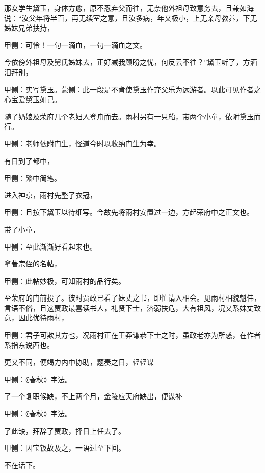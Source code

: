 \begin{parag}
    那女学生黛玉，身体方愈，原不忍弃父而往，无奈他外祖母致意务去，且兼如海说：“汝父年将半百，再无续室之意，且汝多病，年又极小，上无亲母教养，下无姊妹兄弟扶持，\begin{note}甲侧：可怜！一句一滴血，一句一滴血之文。\end{note}今依傍外祖母及舅氏姊妹去，正好减我顾盼之忧，何反云不往？”黛玉听了，方洒泪拜别，\begin{note}甲侧：实写黛玉。蒙侧：此一段是不肯使黛玉作弃父乐为远游者。以此可见作者之心宝爱黛玉如己。\end{note}随了奶娘及荣府几个老妇人登舟而去。雨村另有一只船，带两个小童，依附黛玉而行。\begin{note}甲侧：老师依附门生，怪道今时以收纳门生为幸。\end{note}
\end{parag}


\begin{parag}
    有日到了都中，\begin{note}甲侧：繁中简笔。\end{note}进入神京，雨村先整了衣冠，\begin{note}甲侧：且按下黛玉以待细写。今故先将雨村安置过一边，方起荣府中之正文也。\end{note}带了小童，\begin{note}甲侧：至此渐渐好看起来也。\end{note}拿著宗侄的名帖，\begin{note}甲侧：此帖妙极，可知雨村的品行矣。\end{note}至荣府的门前投了。彼时贾政已看了妹丈之书，即忙请入相会。见雨村相貌魁伟，言语不俗，且这贾政最喜读书人，礼贤下士，济弱扶危，大有祖风，况又系妹丈致意，因此优待雨村，\begin{note}甲侧：君子可欺其方也，况雨村正在王莽谦恭下士之时，虽政老亦为所惑，在作者系指东说西也。\end{note}更又不同，便竭力内中协助，题奏之日，轻轻谋\begin{note}甲侧：《春秋》字法。\end{note}了一个复职候缺，不上两个月，金陵应天府缺出，便谋补\begin{note}甲侧：《春秋》字法。\end{note}了此缺，拜辞了贾政，择日上任去了。\begin{note}甲侧：因宝钗故及之，一语过至下回。\end{note}不在话下。
\end{parag}


